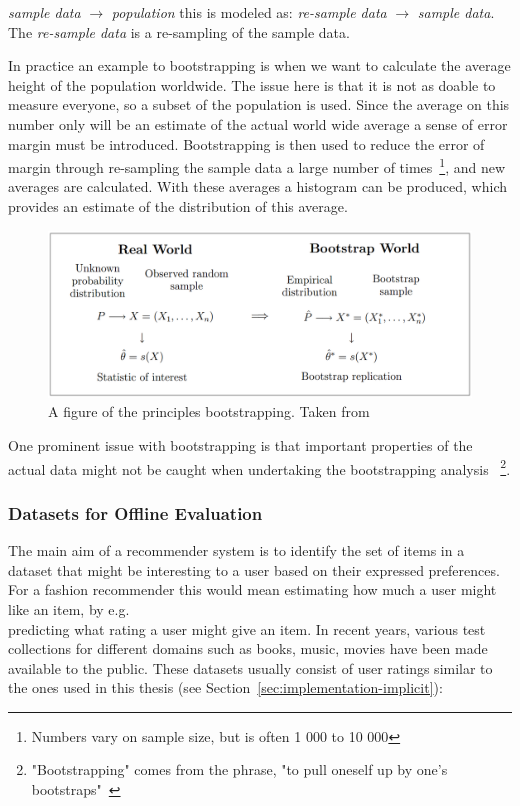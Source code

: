 \emph{sample data} $\rightarrow$ \emph{population} this is modeled as:
\emph{re-sample data} $\rightarrow$ \emph{sample data}.
The \emph{re-sample data} is a re-sampling of the sample data.

In practice an example to bootstrapping is when we want to calculate the
average height of the population worldwide.  The issue here is that it is not
as doable to measure everyone, so a subset of the population is used.  Since
the average on this number only will be an estimate of the actual world wide
average a sense of error margin must be introduced.  Bootstrapping is then used
to reduce the error of margin through re-sampling the sample data a large
number of times~\footnote{Numbers vary on sample size, but is often 1 000 to 10
000}, and new averages are calculated.  With these averages a histogram can be
produced, which provides an estimate of the distribution of this average.

\begin{figure}[H]
    \includegraphics[scale=0.5]{image/bootstrap.png}
    \centering
    \caption[Bootstrapping principles]{A figure of the principles bootstrapping. Taken from~\cite{Eichler2003}}
    \label{figure:bootstrapping}
\end{figure}

One prominent issue with bootstrapping is that important properties of the
actual data might not be caught when undertaking the bootstrapping analysis
~\footnote{"Bootstrapping" comes from the phrase, "to pull oneself up by one's
bootstraps"~\cite{bootstrapSaying1843}}.

\subsubsection{Datasets for Offline Evaluation}
The main aim of a recommender system is to identify the set of items in a
dataset that might be interesting to a user based on their expressed
preferences. For a fashion recommender this would mean estimating how much a
user might like an item, by e.g.\\ predicting what rating a user might give an
item. In recent years, various test collections for different domains such as
books, music, movies have been made available to the public. These datasets
usually consist of user ratings similar to the ones used in this thesis (see
Section~\ref{sec:implementation-implicit}):

